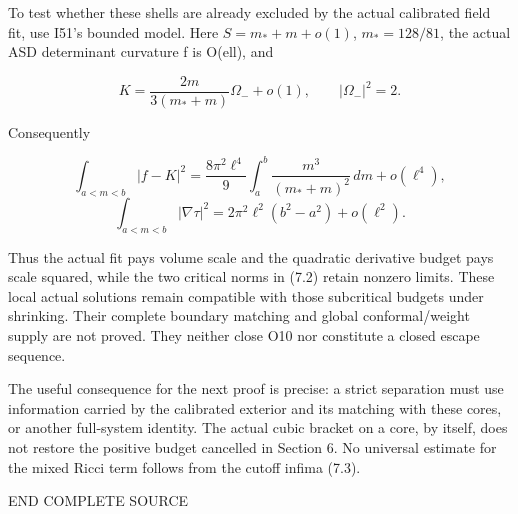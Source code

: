 \documentclass[
  10pt,
]{article}
\begin{document}
To test whether these shells are already excluded by the actual
calibrated field fit, use I51's bounded model. Here \(S=m_*+m+o(1)\),
\(m_*=128/81\), the actual ASD determinant curvature f is O(ell), and

\[
 K=\frac{2m}{3(m_*+m)}\Omega_-+o(1),\qquad |\Omega_-|^2=2.
\]

Consequently

\[
 \int_{a<m<b}|f-K|^2
  =\frac{8\pi^2\ell^4}{9}\int_a^b\frac{m^3}{(m_*+m)^2}\,dm
     +o(\ell^4),
\] \[
 \int_{a<m<b}|\nabla\tau|^2
       =2\pi^2\ell^2(b^2-a^2)+o(\ell^2). \tag{7.4}
\]

Thus the actual fit pays volume scale and the quadratic derivative
budget pays scale squared, while the two critical norms in (7.2) retain
nonzero limits. These local actual solutions remain compatible with
those subcritical budgets under shrinking. Their complete boundary
matching and global conformal/weight supply are not proved. They neither
close O10 nor constitute a closed escape sequence.

The useful consequence for the next proof is precise: a strict
separation must use information carried by the calibrated exterior and
its matching with these cores, or another full-system identity. The
actual cubic bracket on a core, by itself, does not restore the positive
budget cancelled in Section 6. No universal estimate for the mixed Ricci
term follows from the cutoff infima (7.3).

END COMPLETE SOURCE
\end{document}
